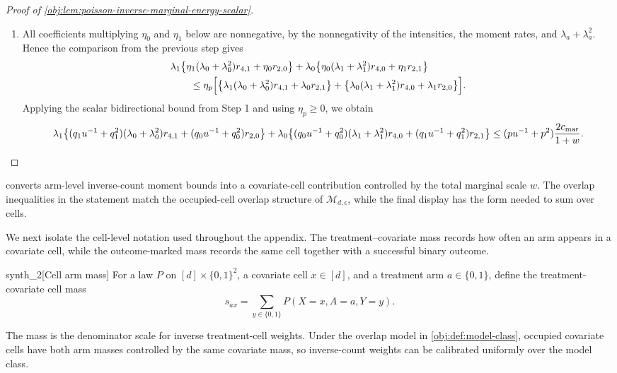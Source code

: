 \documentclass[11pt]{article}
\begin{document}
\begin{proof}[Proof of \cref{obj:lem:poisson-inverse-marginal-energy-scalar}]
\begin{enumerate}
\item All coefficients multiplying \(\eta_0\) and \(\eta_1\) below are nonnegative, by the nonnegativity of the intensities, the moment rates, and \(\lambda_a+\lambda_a^2\).  Hence the comparison from the previous step gives
\[
\begin{aligned}
&\lambda_1\bigl\{\eta_1(\lambda_0+\lambda_0^2)r_{4,1}
 +\eta_0 r_{2,0}\bigr\}
+\lambda_0\bigl\{\eta_0(\lambda_1+\lambda_1^2)r_{4,0}
 +\eta_1 r_{2,1}\bigr\} \\
&\qquad\le
\eta_p\Bigl[
\bigl\{\lambda_1(\lambda_0+\lambda_0^2)r_{4,1}
 +\lambda_0 r_{2,1}\bigr\}
+
\bigl\{\lambda_0(\lambda_1+\lambda_1^2)r_{4,0}
 +\lambda_1 r_{2,0}\bigr\}
\Bigr].
\end{aligned}
\]
Applying the scalar bidirectional bound from Step 1 and using \(\eta_p\ge0\), we obtain
\[
\lambda_1\bigl\{(q_1u^{-1}+q_1^2)(\lambda_0+\lambda_0^2)r_{4,1}
 +(q_0u^{-1}+q_0^2)r_{2,0}\bigr\}
+\lambda_0\bigl\{(q_0u^{-1}+q_0^2)(\lambda_1+\lambda_1^2)r_{4,0}
 +(q_1u^{-1}+q_1^2)r_{2,1}\bigr\}
\le
(pu^{-1}+p^2){2c_{\mathrm{mar}}\over 1+w}.
\]
\end{enumerate}
\end{proof}

 converts arm-level inverse-count moment bounds into a covariate-cell contribution controlled by the total marginal scale \(w\). The overlap inequalities in the statement match the occupied-cell overlap structure of \(\mathcal M_{d,\epsilon}\), while the final display has the form needed to sum over cells.

We next isolate the cell-level notation used throughout the appendix. The treatment--covariate mass records how often an arm appears in a covariate cell, while the outcome-marked mass records the same cell together with a successful binary outcome.

\begin{definitionv}{synth_2}[Cell arm mass]
For a law \(P\) on \([d]\times\{0,1\}^2\), a covariate cell \(x\in[d]\), and a treatment arm \(a\in\{0,1\}\), define the treatment-covariate cell mass
\[
s_{ax}
=
\sum_{y\in\{0,1\}} P(X=x,A=a,Y=y).
\]
\end{definitionv}

The mass  is the denominator scale for inverse treatment-cell weights. Under the overlap model in \cref{obj:def:model-class}, occupied covariate cells have both arm masses controlled by the same covariate mass, so inverse-count weights can be calibrated uniformly over the model class.
\end{document}
